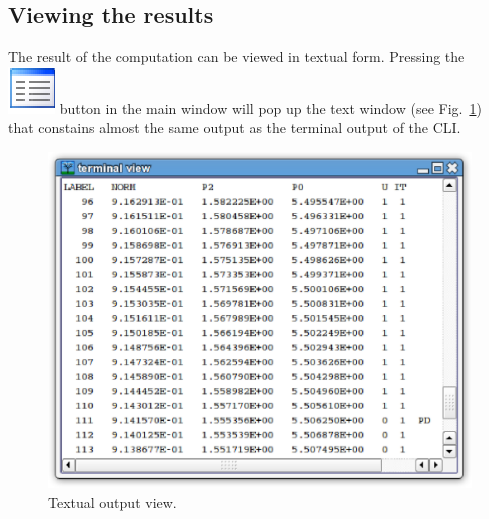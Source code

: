 \documentclass[10pt,a4paper]{ddedoc}
\def\iconText{\includegraphics[scale=0.5]{fig/cr22-action-view_text.eps}}
\begin{document}
\subsection{Viewing the results}

The result of the computation can be viewed in textual form. Pressing the
 \iconText{} button in the main window
will pop up the text window (see Fig.\ \ref{textwindow}) that constains almost
the same output as the terminal output of the CLI.
\begin{figure}[bth!]
\begin{center}
\includegraphics[scale=0.5]{fig/textwindow.eps}
\caption{Textual output view.}
\label{textwindow}
\end{center}
\end{figure}
\end{document}
